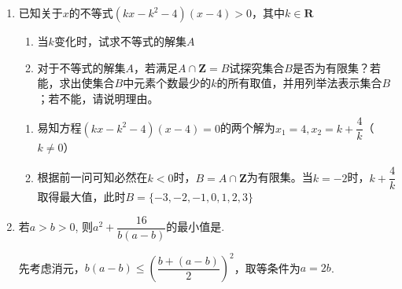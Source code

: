\begin{enumerate}
\begin{enumerate}
        \begin{jieda}
            首先求出$(x+y)\left(\dfrac{a}{x}+\dfrac{1}{y}\right)$最小值(含$a$)，然后令其大于等于9，得到$a$的取值范围，从中选取最小值\\
            $(x+y)\left(\dfrac{a}{x}+\dfrac{1}{y}\right) = a + 1 + \dfrac{ay}{x} + \dfrac{x}{y} \geq a + 1 + 2\sqrt{a}$（$x  = \sqrt{a}y$时取等）\\
            设$f(a) = a+1+2\sqrt{a}$，显然$f(a)$单调递增，且有$f(4) = 9$. 故$a \geq 4$时原式$\geq 9$，因此$a$最小值为4.
        \end{jieda}
    \item 已知关于$x$的不等式$(kx - k^2-4)(x-4) > 0$，其中$k \in \mathbf{R}$
    \begin{enumerate}
        \item 当$k$变化时，试求不等式的解集$A$
        \item 对于不等式的解集$A$，若满足$A \cap \mathbf{Z} = B$试探究集合$B$是否为有限集？若能，求出使集合$B$中元素个数最少的$k$的所有取值，并用列举法表示集合$B$；若不能，请说明理由。
    \end{enumerate}
    \begin{jieda}
        \begin{enumerate}
            \item 易知方程$(kx - k^2-4)(x-4) = 0$的两个解为$x_1 = 4, x_2 = k + \dfrac{4}{k}$（$k \neq 0$）
            \item 根据前一问可知必然在$k < 0$时，$B = A \cap \mathbf{Z}$为有限集。当$k = -2$时，$k + \dfrac{4}{k}$取得最大值，此时$B = \{-3, -2, -1, 0, 1, 2, 3\}$
        \end{enumerate}
    \end{jieda}
    \item 若$a>b>0$, 则$a^2+\dfrac{16}{b(a-b)}$的最小值是. 
    \begin{jieda}
        先考虑消元，$b(a-b) \leq \left (\dfrac{b+(a-b)}{2}\right )^2$，取等条件为$a = 2b$. \\

\end{jieda}
\end{enumerate}
\end{enumerate}

